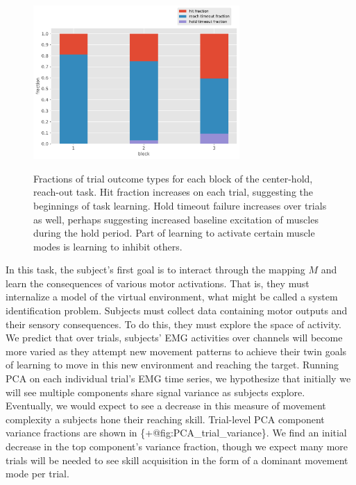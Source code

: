 \begin{figure}
\label{fig:hit_fraction}
\centering
\includegraphics[width=0.7\textwidth,height=\textheight]{images/data_analysis/center_hold/hit_fraction.pdf}
\caption{Fractions of trial outcome types for each block of the
center-hold, reach-out task. Hit fraction increases on each trial,
suggesting the beginnings of task learning. Hold timeout failure
increases over trials as well, perhaps suggesting increased baseline
excitation of muscles during the hold period. Part of learning to
activate certain muscle modes is learning to inhibit
others.}\label{fig:hit_fraction}
\end{figure}

In this task, the subject's first goal is to interact through the
mapping \(M\) and learn the consequences of various motor activations.
That is, they must internalize a model of the virtual environment, what
might be called a system identification problem. Subjects must collect
data containing motor outputs and their sensory consequences. To do
this, they must explore the space of activity. We predict that over
trials, subjects' EMG activities over channels will become more varied
as they attempt new movement patterns to achieve their twin goals of
learning to move in this new environment and reaching the target.
Running PCA on each individual trial's EMG time series, we hypothesize
that initially we will see multiple components share signal variance as
subjects explore. Eventually, we would expect to see a decrease in this
measure of movement complexity a subjects hone their reaching skill.
Trial-level PCA component variance fractions are shown in
\{+@fig:PCA\_trial\_variance\}. We find an initial decrease in the top
component's variance fraction, though we expect many more trials will be
needed to see skill acquisition in the form of a dominant movement mode
per trial.

